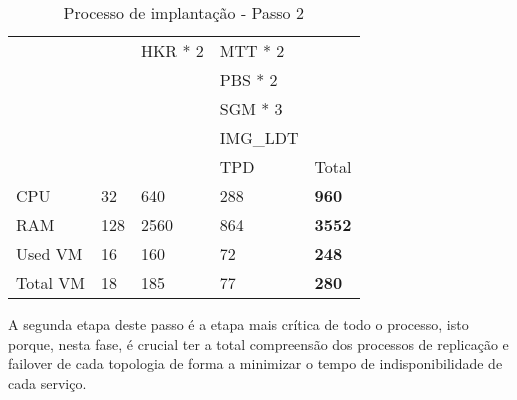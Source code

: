 \begin{table}[H]
\begin{tabular}{|l|l|l|l|l|}
                                     &                                             & \cellcolor[HTML]{A9D08E}HKR * 2              & \cellcolor[HTML]{BDD7EE}MTT * 2              &                              \\ \cline{1-4}
                                     &                                             &                                              & \cellcolor[HTML]{BDD7EE}PBS * 2              &                              \\ \cline{1-4}
                                     &                                             &                                              & \cellcolor[HTML]{BDD7EE}SGM * 3              &                              \\ \cline{1-4}
                                     &                                             &                                              & \cellcolor[HTML]{BDD7EE}IMG\_LDT                  & \\ \cline{1-4}
                                     &                                             &                                              & \cellcolor[HTML]{BDD7EE}TPD                  & Total                        \\ \cline{1-5}
    \cellcolor[HTML]{C0C0C0}CPU      & 32                                          & 640                                          & 288                                          & \textbf{960}                 \\ \cline{1-5}
    \cellcolor[HTML]{C0C0C0}RAM      & 128                                         & 2560                                         & 864                                          & \textbf{3552}                \\ \cline{1-5}
    \cellcolor[HTML]{C0C0C0}Used VM  & 16                                          & 160                                          & 72                                           & \textbf{248}                 \\ \cline{1-5}
    \cellcolor[HTML]{C0C0C0}Total VM & 18                                          & 185                                          & 77                                           & \textbf{280}                 \\ \cline{1-5}
  \end{tabular}
  \caption{Processo de implantação - Passo 2}
  \label{tab:strat-2}
\end{table}

A segunda etapa deste passo é a etapa mais crítica de todo o processo, isto porque, nesta fase, é
crucial ter a total compreensão dos processos de replicação e \gls{failover} de cada topologia de
forma a minimizar o tempo de indisponibilidade de cada serviço.

